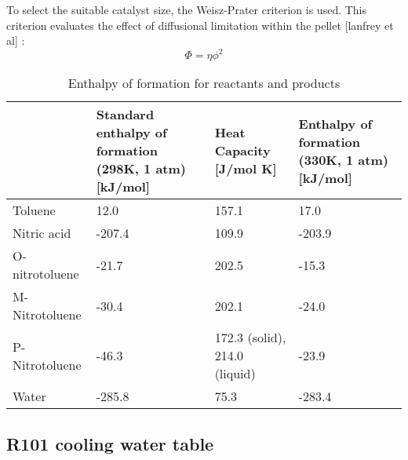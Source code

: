 To select the suitable catalyst size, the Weisz-Prater criterion is used. This criterion evaluates the effect of diffusional limitation within the pellet [lanfrey et al] :
\begin{equation}
    \Phi = \eta \phi^2
\end{equation}

\begin{table}[H]
\centering
\caption{Enthalpy of formation for reactants and products}
\label{tab:Heat enthalpy table}
\begin{tabularx}{\linewidth}{l|XXX}
\toprule
                                                                & Standard enthalpy of formation (298K, 1 atm) [kJ/mol] & Heat Capacity [J/mol K] & Enthalpy of formation (330K, 1 atm) [kJ/mol] \\ \midrule
Toluene                        & 12.0              & 157.1              & 17.0                     \\
Nitric acid                      & -207.4              & 109.9              & -203.9                       \\
O-nitrotoluene & -21.7             & 202.5              & -15.3              \\ 
M-Nitrotoluene                      & -30.4              & 202.1             & -24.0                       \\
P-Nitrotoluene                      & -46.3              & 172.3 (solid), 214.0 (liquid)             & -23.9                        \\
Water                     & -285.8              & 75.3              & -283.4                        \\
\bottomrule
\end{tabularx}
\end{table}

\subsection{R101 cooling water table}
\begin{table}[h]
\centering
\caption{Cooling water sources for R101}
\label{tab:cwtable}
\end{table}

